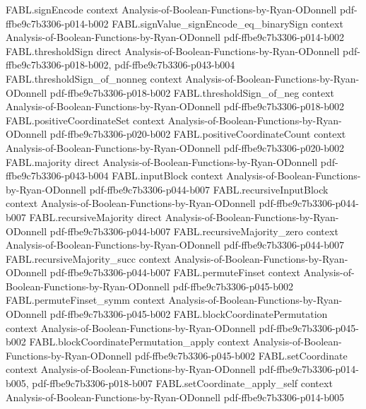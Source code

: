 \begin{theorem}
  {FABL.signEncode}
  {context}
  {Analysis-of-Boolean-Functions-by-Ryan-ODonnell}
  {pdf-ffbe9c7b3306-p014-b002}
\proofstep
  {FABL.signValue_signEncode_eq_binarySign}
  {context}
  {Analysis-of-Boolean-Functions-by-Ryan-ODonnell}
  {pdf-ffbe9c7b3306-p014-b002}
\proofstep
  {FABL.thresholdSign}
  {direct}
  {Analysis-of-Boolean-Functions-by-Ryan-ODonnell}
  {pdf-ffbe9c7b3306-p018-b002,
    pdf-ffbe9c7b3306-p043-b004}
\proofstep
  {FABL.thresholdSign_of_nonneg}
  {context}
  {Analysis-of-Boolean-Functions-by-Ryan-ODonnell}
  {pdf-ffbe9c7b3306-p018-b002}
\proofstep
  {FABL.thresholdSign_of_neg}
  {context}
  {Analysis-of-Boolean-Functions-by-Ryan-ODonnell}
  {pdf-ffbe9c7b3306-p018-b002}
\proofstep
  {FABL.positiveCoordinateSet}
  {context}
  {Analysis-of-Boolean-Functions-by-Ryan-ODonnell}
  {pdf-ffbe9c7b3306-p020-b002}
\proofstep
  {FABL.positiveCoordinateCount}
  {context}
  {Analysis-of-Boolean-Functions-by-Ryan-ODonnell}
  {pdf-ffbe9c7b3306-p020-b002}
\proofstep
  {FABL.majority}
  {direct}
  {Analysis-of-Boolean-Functions-by-Ryan-ODonnell}
  {pdf-ffbe9c7b3306-p043-b004}
\proofstep
  {FABL.inputBlock}
  {context}
  {Analysis-of-Boolean-Functions-by-Ryan-ODonnell}
  {pdf-ffbe9c7b3306-p044-b007}
\proofstep
  {FABL.recursiveInputBlock}
  {context}
  {Analysis-of-Boolean-Functions-by-Ryan-ODonnell}
  {pdf-ffbe9c7b3306-p044-b007}
\proofstep
  {FABL.recursiveMajority}
  {direct}
  {Analysis-of-Boolean-Functions-by-Ryan-ODonnell}
  {pdf-ffbe9c7b3306-p044-b007}
\proofstep
  {FABL.recursiveMajority_zero}
  {context}
  {Analysis-of-Boolean-Functions-by-Ryan-ODonnell}
  {pdf-ffbe9c7b3306-p044-b007}
\proofstep
  {FABL.recursiveMajority_succ}
  {context}
  {Analysis-of-Boolean-Functions-by-Ryan-ODonnell}
  {pdf-ffbe9c7b3306-p044-b007}
\proofstep
  {FABL.permuteFinset}
  {context}
  {Analysis-of-Boolean-Functions-by-Ryan-ODonnell}
  {pdf-ffbe9c7b3306-p045-b002}
\proofstep
  {FABL.permuteFinset_symm}
  {context}
  {Analysis-of-Boolean-Functions-by-Ryan-ODonnell}
  {pdf-ffbe9c7b3306-p045-b002}
\proofstep
  {FABL.blockCoordinatePermutation}
  {context}
  {Analysis-of-Boolean-Functions-by-Ryan-ODonnell}
  {pdf-ffbe9c7b3306-p045-b002}
\proofstep
  {FABL.blockCoordinatePermutation_apply}
  {context}
  {Analysis-of-Boolean-Functions-by-Ryan-ODonnell}
  {pdf-ffbe9c7b3306-p045-b002}
\proofstep
  {FABL.setCoordinate}
  {context}
  {Analysis-of-Boolean-Functions-by-Ryan-ODonnell}
  {pdf-ffbe9c7b3306-p014-b005,
    pdf-ffbe9c7b3306-p018-b007}
\proofstep
  {FABL.setCoordinate_apply_self}
  {context}
  {Analysis-of-Boolean-Functions-by-Ryan-ODonnell}
  {pdf-ffbe9c7b3306-p014-b005}

\end{theorem}
